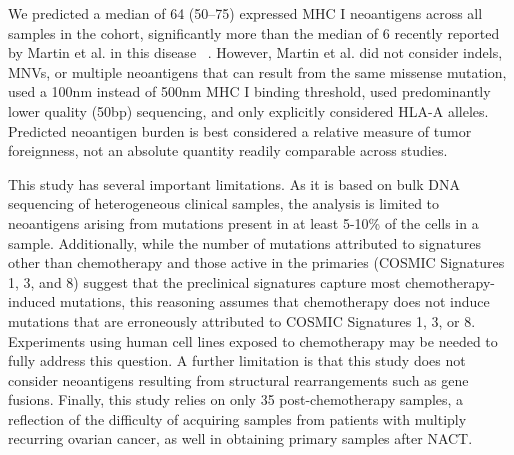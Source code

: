 We predicted a median of 64 (50--75) expressed MHC I neoantigens across all samples in the cohort, significantly more than the median of 6 recently reported by Martin et al. in this disease ~\cite{Martin_2016}. However, Martin et al. did not consider indels, MNVs, or multiple neoantigens that can result from the same missense mutation, used a 100nm instead of 500nm MHC I binding threshold, used predominantly lower quality (50bp) sequencing, and only explicitly considered HLA-A alleles. Predicted neoantigen burden is best considered a relative measure of tumor foreignness, not an absolute quantity readily comparable across studies.

This study has several important limitations. As it is based on bulk DNA sequencing of heterogeneous clinical samples, the analysis is limited to neoantigens arising from mutations present in at least 5-10\% of the cells in a sample. Additionally, while the number of mutations attributed to signatures other than chemotherapy and those active in the primaries (COSMIC Signatures 1, 3, and 8) suggest that the preclinical signatures capture most chemotherapy-induced mutations, this reasoning assumes that chemotherapy does not induce mutations that are erroneously attributed to COSMIC Signatures 1, 3, or 8. Experiments using human cell lines exposed to chemotherapy may be needed to fully address this question. A further limitation is that this study does not consider neoantigens resulting from structural rearrangements such as gene fusions. Finally, this study relies on only 35 post-chemotherapy samples, a reflection of the difficulty of acquiring samples from patients with multiply recurring ovarian cancer, as well in obtaining primary samples after NACT.